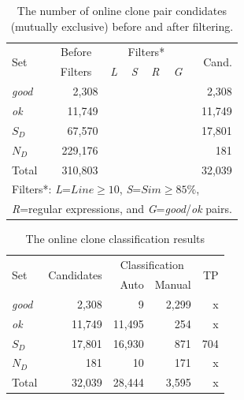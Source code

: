 \documentclass{sig-alternate-05-2015}
\begin{document}
\begin{table}
	\centering
	\caption{The number of online clone pair condidates (mutually exclusive) before and after filtering.}
	\label{tab:online_clone_pairs}
	\small
	\begin{tabular}{l|r|c|c|c|c|r}
		\hline
		\multirow{2}{*}{Set} & \multicolumn{1}{c|}{Before} & \multicolumn{4}{c|}{Filters*} & \multirow{2}{*}{Cand.} \\ \cline{3-6}
		& \multicolumn{1}{c|}{Filters} & \textit{L} & \textit{S} & \textit{R} & \textit{G} & \\
		\hline 
		\multirow{1}{*}{\textit{good}} & 2,308 & & & & & 2,308 \\
		\multirow{1}{*}{\textit{ok}} & 11,749 & & & & & 11,749 \\
		\multirow{1}{*}{$S_D$} & 67,570 & \checkmark & & \checkmark & \checkmark & 17,801 \\
		\multirow{1}{*}{$N_D$} & 229,176 & & \checkmark & \checkmark & \checkmark & 181 \\ 
		\hline
		Total  & 310,803 & & & & & 32,039 \\ 
		\hline
		\multicolumn{7}{l}{\scriptsize{Filters*: \textit{L}=$Line \geq 10$, \textit{S}=$Sim \geq 85\%$,}} \\
		\multicolumn{7}{l}{\scriptsize{\textit{R}=regular expressions, and \textit{G}=\textit{good}/\textit{ok} pairs.}} \\
	\end{tabular} %
\end{table}

\begin{table}
	\centering
	\caption{The online clone classification results}
	\label{tab:online_clone_classification_results}
	\small
	\begin{tabular}{l|r|r|r|r}
		\hline
		\multirow{2}{*}{Set} & \multirow{2}{*}{Candidates} & \multicolumn{2}{c|}{Classification} & \multirow{2}{*}{TP} \\ \cline{3-4}
		& & Auto & Manual & \\
		\hline 
		\multirow{1}{*}{\textit{good}} & 2,308 & 9 & 2,299 & x \\
		\multirow{1}{*}{\textit{ok}} & 11,749 & 11,495 & 254 & x \\
		\multirow{1}{*}{$S_D$} & 17,801 & 16,930 & 871 & 704 \\
		\multirow{1}{*}{$N_D$} & 181 & 10 & 171 & x \\ 
		\hline
		Total  & 32,039 & 28,444 & 3,595 & x \\ 
		\hline
	\end{tabular} %
\end{table}
\end{document}
